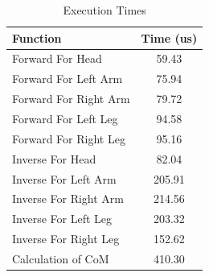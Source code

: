 \begin{table}[!h]
\centering
\caption{Execution Times}
\vspace*{0.06cm}
\begin{tabular}{|l|c|}
\hline
\textbf{Function} & \textbf{Time (us)}\\ \hline
Forward For Head & 59.43 \\
Forward For Left Arm & 75.94 \\
Forward For Right Arm & 79.72 \\
Forward For Left Leg & 94.58 \\
Forward For Right Leg & 95.16 \\
Inverse For Head & 82.04 \\
Inverse For Left Arm & 205.91 \\
Inverse For Right Arm & 214.56 \\
Inverse For Left Leg & 203.32 \\
Inverse For Right Leg & 152.62 \\
Calculation of CoM & 410.30 \\
\hline
\end{tabular}
\label{times}
\end{table}
